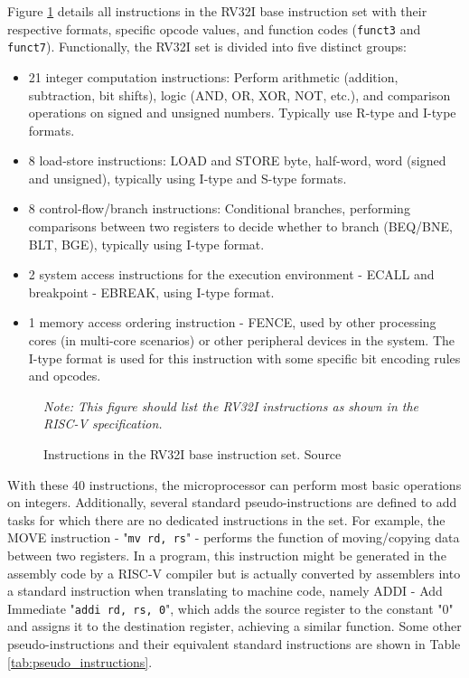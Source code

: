 Figure \ref{fig:rv32i_instructions} details all instructions in the RV32I base instruction set with their respective formats, specific opcode values, and function codes (\texttt{funct3} and \texttt{funct7}). Functionally, the RV32I set is divided into five distinct groups:
\begin{itemize}
    \item 21 integer computation instructions: Perform arithmetic (addition, subtraction, bit shifts), logic (AND, OR, XOR, NOT, etc.), and comparison operations on signed and unsigned numbers. Typically use R-type and I-type formats.
    \item 8 load-store instructions: LOAD and STORE byte, half-word, word (signed and unsigned), typically using I-type and S-type formats.
    \item 8 control-flow/branch instructions: Conditional branches, performing comparisons between two registers to decide whether to branch (BEQ/BNE, BLT, BGE), typically using I-type format.
    \item 2 system access instructions for the execution environment - ECALL and breakpoint - EBREAK, using I-type format.
    \item 1 memory access ordering instruction - FENCE, used by other processing cores (in multi-core scenarios) or other peripheral devices in the system. The I-type format is used for this instruction with some specific bit encoding rules and opcodes.
\end{itemize}

\begin{figure}[h!]
    \centering
    \caption{Instructions in the RV32I base instruction set. Source \cite{waterman2014riscv}}
    \label{fig:rv32i_instructions}
    \textit{Note: This figure should list the RV32I instructions as shown in the RISC-V specification.}
\end{figure}

With these 40 instructions, the microprocessor can perform most basic operations on integers. Additionally, several standard pseudo-instructions are defined to add tasks for which there are no dedicated instructions in the set. For example, the MOVE instruction - "\texttt{mv rd, rs}" - performs the function of moving/copying data between two registers. In a program, this instruction might be generated in the assembly code by a RISC-V compiler but is actually converted by assemblers into a standard instruction when translating to machine code, namely ADDI - Add Immediate "\texttt{addi rd, rs, 0}", which adds the source register to the constant "0" and assigns it to the destination register, achieving a similar function. Some other pseudo-instructions and their equivalent standard instructions are shown in Table \ref{tab:pseudo_instructions}.

